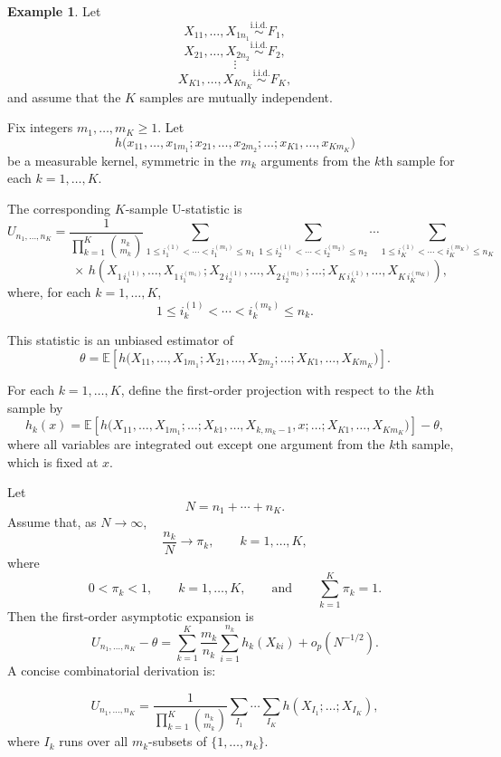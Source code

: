 \documentclass[11pt]{article}
\theoremstyle{definition}
\newtheorem{exmp}{Example}[section]
\begin{document}
\begin{exmp}
Let
\[
X_{11},\dots,X_{1n_1}\overset{\text{i.i.d.}}{\sim}F_1,
\]
\[
X_{21},\dots,X_{2n_2}\overset{\text{i.i.d.}}{\sim}F_2,
\]
\[
\vdots
\]
\[
X_{K1},\dots,X_{Kn_K}\overset{\text{i.i.d.}}{\sim}F_K,
\]
and assume that the $K$ samples are mutually independent.

Fix integers $m_1,\dots,m_K\ge 1$. Let
\[
h\bigl(x_{11},\dots,x_{1m_1};x_{21},\dots,x_{2m_2};\dots;x_{K1},\dots,x_{Km_K}\bigr)
\]
be a measurable kernel, symmetric in the $m_k$ arguments from the $k$th sample for each $k=1,\dots,K$.

The corresponding $K$-sample U-statistic is
\[
U_{n_1,\dots,n_K}
=
\frac{1}{\prod_{k=1}^K \binom{n_k}{m_k}}
\sum_{1\le i_1^{(1)}<\cdots<i_1^{(m_1)}\le n_1}
\sum_{1\le i_2^{(1)}<\cdots<i_2^{(m_2)}\le n_2}
\cdots
\sum_{1\le i_K^{(1)}<\cdots<i_K^{(m_K)}\le n_K}
\]
\[
\qquad\qquad \times\,
h\!\left(
X_{1\,i_1^{(1)}},\dots,X_{1\,i_1^{(m_1)}};
X_{2\,i_2^{(1)}},\dots,X_{2\,i_2^{(m_2)}};
\dots;
X_{K\,i_K^{(1)}},\dots,X_{K\,i_K^{(m_K)}}
\right),
\]
where, for each $k=1,\dots,K$,
\[
1\le i_k^{(1)}<\cdots<i_k^{(m_k)}\le n_k.
\]

This statistic is an unbiased estimator of
\[
\theta
=
\mathbb{E}\!\left[
h\bigl(
X_{11},\dots,X_{1m_1};
X_{21},\dots,X_{2m_2};
\dots;
X_{K1},\dots,X_{Km_K}
\bigr)
\right].
\]

For each $k=1,\dots,K$, define the first-order projection with respect to the $k$th sample by
\[
h_k(x)
=
\mathbb{E}\!\left[
h\bigl(
X_{11},\dots,X_{1m_1};
\dots;
X_{k1},\dots,X_{k,m_k-1},x;
\dots;
X_{K1},\dots,X_{Km_K}
\bigr)
\right]
-\theta,
\]
where all variables are integrated out except one argument from the $k$th sample, which is fixed at $x$.

Let
\[
N=n_1+\cdots+n_K.
\]
Assume that, as $N\to\infty$,
\[
\frac{n_k}{N}\to \pi_k,\qquad k=1,\dots,K,
\]
where
\[
0<\pi_k<1,\qquad k=1,\dots,K,
\qquad\text{and}\qquad
\sum_{k=1}^K \pi_k=1.
\]
Then the first-order asymptotic expansion is
\[
U_{n_1,\dots,n_K}-\theta
=
\sum_{k=1}^K \frac{m_k}{n_k}\sum_{i=1}^{n_k} h_k(X_{ki})
+o_p(N^{-1/2}).
\]
A concise combinatorial derivation is:

\[
U_{n_1,\dots,n_K}
=
\frac{1}{\prod_{k=1}^K \binom{n_k}{m_k}}
\sum_{I_1}\cdots\sum_{I_K} h(X_{I_1};\dots;X_{I_K}),
\]
where \(I_k\) runs over all \(m_k\)-subsets of \(\{1,\dots,n_k\}\).


\end{exmp}
\end{document}
